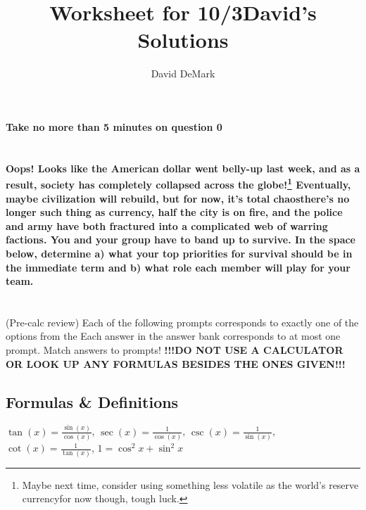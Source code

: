 \documentclass[english]{article}
\title{Worksheet for 10/3\textemdash David's Solutions}
\author{David DeMark}
\date{\due}
\newcommand{\prob}[1]{\setcounter{section}{#1-1}\section{}}
\theoremstyle{remark}
\theoremstyle{definition}
\begin{document}
{\bf \Large Take no more than 5 minutes on question 0\textellipsis}
\prob{0}\textbf{Oops! Looks like the American dollar went belly-up last week, and as a result, society has completely collapsed across the globe!\footnote{Maybe next time, consider using something less volatile as the world's reserve currency\textemdash for now though, tough luck.} Eventually, maybe civilization will rebuild, but for now, it's total chaos\textemdash there's no longer such thing as currency, half the city is on fire, and the police and army have both fractured into a complicated web of warring factions. You and your group have to band up to survive. In the space below, determine a) what your top priorities for survival should be in the immediate term and b) what role each member will play for your team.}\vspace{4cm}

		\prob{1}{(Pre-calc review) Each of the following prompts corresponds to exactly one of the options from the  Each answer in the answer bank corresponds to at most one prompt. Match answers to prompts! \textbf{!!!DO NOT USE A CALCULATOR OR LOOK UP ANY FORMULAS BESIDES THE ONES GIVEN!!!}}\newline
		\subsection*{Formulas \& Definitions}
		
		$\tan(x)=\frac{\sin(x)}{\cos(x)}$,
		$	\sec(x)=\frac{1}{\cos(x)}$,
		$	\csc(x)=\frac{1}{\sin(x)}$,
		$	\cot(x)=\frac{1}{\tan(x)}$,
$1=\cos^2x+\sin^2x$
\end{document}
